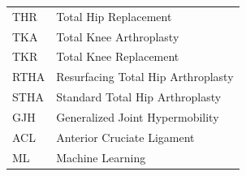 \documentclass[12pt]{elsarticle}
\begin{document}
{\begin{longtable}{p{3cm} p{10.5cm}}
THR & Total Hip Replacement \\
TKA & Total Knee Arthroplasty \\
TKR & Total Knee Replacement \\
RTHA & Resurfacing Total Hip Arthroplasty \\
STHA & Standard Total Hip Arthroplasty \\
GJH & Generalized Joint Hypermobility \\
ACL & Anterior Cruciate Ligament \\
ML & Machine Learning \\
\hline
\end{longtable}
}

\begingroup\small


\endgroup
\end{document}
